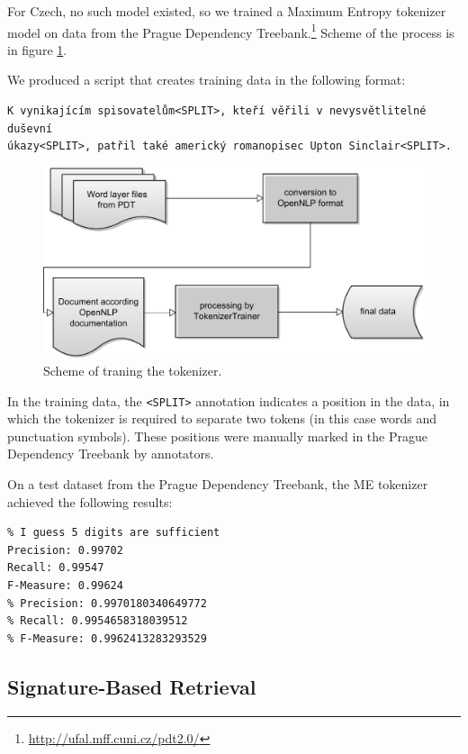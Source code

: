 For Czech, no such model existed, so we trained a Maximum Entropy tokenizer
model on data from the Prague Dependency Treebank.\footnote{\url{http://ufal.mff.cuni.cz/pdt2.0/}} Scheme of the process is in figure \ref{fig:tokenizer}. 

We produced a script that creates training data in the following format:
\begin{verbatim}
K vynikajícím spisovatelům<SPLIT>, kteří věřili v nevysvětlitelné duševní 
úkazy<SPLIT>, patřil také americký romanopisec Upton Sinclair<SPLIT>.
\end{verbatim}

\begin{figure}[h]
\begin{center}
\includegraphics[scale=0.6]{figures/creatingTokenizationModel.pdf}
\end{center}
\caption{Scheme of traning the tokenizer.}
\label{fig:tokenizer}
\end{figure}

In the training data, the \verb|<SPLIT>| annotation indicates a position in the data, in which the
tokenizer is required to separate two tokens (in this case words and punctuation symbols). These
positions were manually marked in the Prague Dependency Treebank by annotators.

On a test dataset from the Prague Dependency Treebank, the ME tokenizer achieved the following results:

\begin{lstlisting}
% I guess 5 digits are sufficient
Precision: 0.99702
Recall: 0.99547
F-Measure: 0.99624
% Precision: 0.9970180340649772
% Recall: 0.9954658318039512
% F-Measure: 0.9962413283293529
\end{lstlisting}

\subsection{Signature-Based Retrieval}

